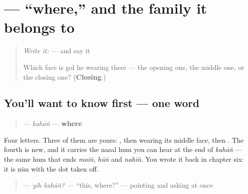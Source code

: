 \section[\texorpdfstring{\ur{کہاں} (kahāṅ)}{کہاں (kahāṅ)}]{ — \textquotedblleft{}where,\textquotedblright{} and the family it belongs to}

\label{lesson:UR-C17-kahan}



\begin{quote}
\emph{Write it:}  — and say it

Which face is gol he wearing there — the opening one, the middle one, or the closing one? (\textbf{Closing}.)
\end{quote}

\subsection*{You'll want to know first — one word}
\begin{quote}
\textbf{} — \emph{kahāṅ} — \textbf{where}
\end{quote}

Four letters. Three of them are yours: \textbf{}, then \textbf{} wearing its middle face, then \textbf{}. The fourth is new, and it carries the nasal hum you can hear at the end of \emph{kahāṅ} — the same hum that ends \emph{maiṅ}, \emph{hūṅ} and \emph{nahīṅ}. You wrote it back in chapter six: it is nūn with the dot taken off.

\begin{quote}
\textbf{ } — \emph{yih kahāṅ?} — \textquotedblleft{}this, where?\textquotedblright{} — pointing and asking at once
\end{quote}

